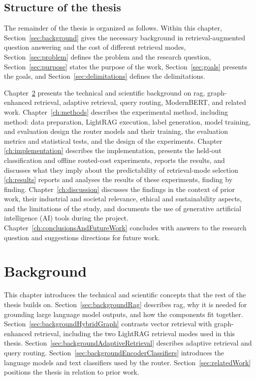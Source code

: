 \documentclass[english, bibtex]{kththesis}               %
\numberwithin{listing}{chapter}
\providecommand{\DIFaddtex}[1]{{\protect\color{blue} \sf #1}} %
\providecommand{\DIFdeltex}[1]{{\protect\color{red} \scriptsize #1}} %
\providecommand{\DIFaddbegin}{} %
\providecommand{\DIFaddend}{} %
\providecommand{\DIFdelbegin}{} %
\providecommand{\DIFdelend}{} %
\providecommand{\DIFadd}[1]{\texorpdfstring{\DIFaddtex{#1}}{#1}} %
\providecommand{\DIFdel}[1]{\texorpdfstring{\DIFdeltex{#1}}{}} %
\begin{document}
\section{Structure of the thesis}
\label{sec:structure}

\DIFaddbegin \DIFadd{The remainder of the thesis is organized as follows. Within this chapter, Section~\ref{sec:background} gives the necessary background in retrieval-augmented question answering and the cost of different retrieval modes, Section~\ref{sec:problem} defines the problem and the research question, Section~\ref{sec:purpose} states the purpose of the work, Section~\ref{sec:goals} presents the goals, and Section~\ref{sec:delimitations} defines the delimitations.
}

\DIFaddend Chapter~\ref{ch:background} presents the technical and scientific background on \gls{rag}, graph-enhanced retrieval, adaptive retrieval, query routing, ModernBERT, and related work. Chapter~\ref{ch:methods} describes the \DIFdelbegin \DIFdel{experimental method, including }\DIFdelend \DIFaddbegin \DIFadd{method: }\DIFaddend data preparation, LightRAG execution, label generation, \DIFdelbegin \DIFdel{model training, and evaluation design}\DIFdelend \DIFaddbegin \DIFadd{the router models and their training, the evaluation metrics and statistical tests, and the design of the experiments}\DIFaddend . Chapter~\DIFdelbegin \DIFdel{\ref{ch:implementation} describes the implementation, presents the held-out classification and offline routed-cost experiments, reports the results, and discusses what they imply about the predictability of retrieval-mode selection}\DIFdelend \DIFaddbegin \DIFadd{\ref{ch:results} reports and analyses the results of these experiments, finding by finding. Chapter~\ref{ch:discussion} discusses the findings in the context of prior work, their industrial and societal relevance, ethical and sustainability aspects, and the limitations of the study, and documents the use of generative artificial intelligence (AI) tools during the project}\DIFaddend . Chapter~\ref{ch:conclusionsAndFutureWork} concludes with answers to the research question and \DIFdelbegin \DIFdel{suggestions }\DIFdelend \DIFaddbegin \DIFadd{directions }\DIFaddend for future work.

\cleardoublepage
\chapter{Background}
\label{ch:background}

This chapter introduces the technical and scientific concepts that the rest of the thesis builds on. Section~\ref{sec:backgroundRag} describes \gls{rag}, why it is needed for grounding large language model outputs, and how the components fit together. Section~\ref{sec:backgroundHybridGraph} contrasts vector retrieval with graph-enhanced retrieval, including the two LightRAG retrieval modes used in this thesis. Section~\ref{sec:backgroundAdaptiveRetrieval} describes adaptive retrieval and query routing. Section~\ref{sec:backgroundEncoderClassifiers} introduces the language models and text classifiers used by the router. Section~\ref{sec:relatedWork} positions the thesis in relation to prior work.
\end{document}
